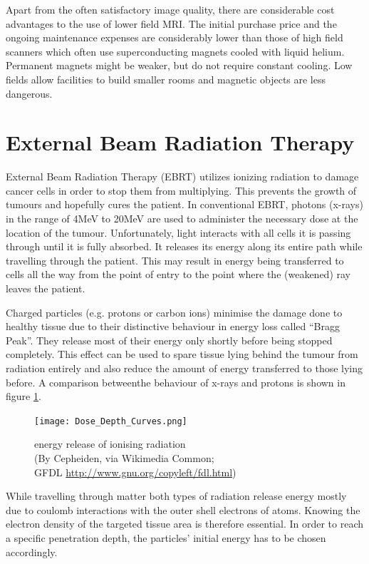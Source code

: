 Apart from the often satisfactory image quality, there are considerable cost advantages to the use of lower field MRI.
The initial purchase price and the ongoing maintenance expenses are considerably lower than those of high field scanners which often use superconducting magnets cooled with liquid helium. \cite{Rutt1996}
Permanent magnets might be weaker, but do not require constant cooling.
Low fields allow facilities to build smaller rooms and magnetic objects are less dangerous.



\section{External Beam Radiation Therapy}
\label{sec:planning}
External Beam Radiation Therapy (EBRT) utilizes ionizing radiation to damage cancer cells in order to stop them from multiplying.
This prevents the growth of tumours and hopefully cures the patient. 
In conventional EBRT, photons (x-rays) in the range of 4MeV to 20MeV are used to administer the necessary dose at the location of the tumour.
Unfortunately, light interacts with all cells it is passing through until it is fully absorbed.
It releases its energy along its entire path while travelling through the patient.
This may result in energy being transferred to cells all the way from the point of entry to the point where the (weakened) ray leaves the patient.

Charged particles (e.g. protons or carbon ions) minimise the damage done to healthy tissue due to their distinctive behaviour in energy loss called ``Bragg Peak''.
They release most of their energy only shortly before being stopped completely.
\cite{Nakamura2010} This effect can be used to spare tissue lying behind the tumour from radiation entirely and also reduce the amount of energy transferred to those lying before. \cite{Paganetti2005}
A comparison betweenthe behaviour of x-rays and protons is shown in figure \ref{fig:bragg}.

\begin{figure}[!h]
	\centering
	\texttt{[image: Dose\_Depth\_Curves.png]}
	\caption{energy release of ionising radiation \\(By Cepheiden, via Wikimedia Common;\\ GFDL \url{http://www.gnu.org/copyleft/fdl.html})}
	\label{fig:bragg}
\end{figure}

While travelling through matter both types of radiation release energy mostly due to coulomb interactions with the outer shell electrons of atoms.
Knowing the electron density of the targeted tissue area is therefore essential.
In order to reach a specific penetration depth, the particles' initial energy has to be chosen accordingly.

